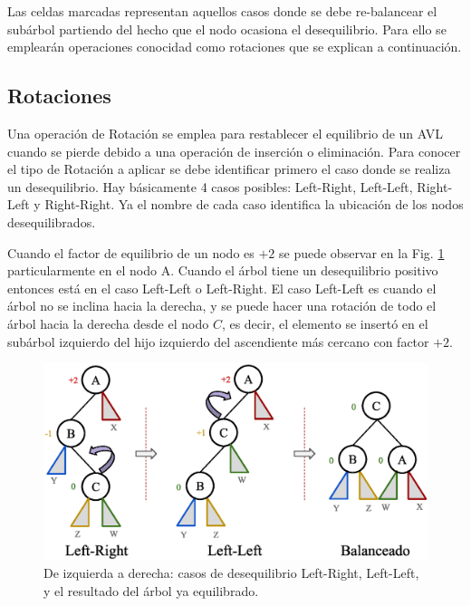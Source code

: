 Las celdas marcadas representan aquellos casos donde se debe re-balancear el subárbol partiendo del hecho que el nodo ocasiona el desequilibrio. Para ello se emplearán operaciones conocidad como rotaciones que se explican a continuación.

\subsection{Rotaciones}

Una operación de Rotación se emplea para restablecer el equilibrio de un AVL cuando se pierde debido a una operación de inserción o eliminación. Para conocer el tipo de Rotación a aplicar se debe identificar primero el caso donde se realiza un desequilibrio. Hay básicamente 4 casos posibles: Left-Right, Left-Left, Right-Left y Right-Right. Ya el nombre de cada caso identifica la ubicación de los nodos desequilibrados.

Cuando el factor de equilibrio de un nodo es $+2$ se puede observar en la Fig. \ref{fig:AVLRotation1} particularmente en el nodo A. Cuando el árbol tiene un desequilibrio positivo entonces está en el caso Left-Left o Left-Right. El caso Left-Left es cuando el árbol no se inclina hacia la derecha, y se puede hacer una rotación de todo el árbol hacia la derecha desde el nodo $C$, es decir, el elemento se insertó en el subárbol izquierdo del hijo izquierdo del ascendiente más cercano con factor $+2$. 

\begin{figure}[htpb!]
  \begin{center}
    \includegraphics[width=1.0\textwidth]{images/AVLRotation1.eps}
  \end{center}
  \caption{De izquierda a derecha: casos de desequilibrio Left-Right, Left-Left, y el resultado del árbol ya equilibrado.}
  \label{fig:AVLRotation1}
\end{figure}

